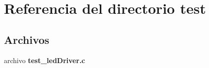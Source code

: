 \section{Referencia del directorio test}
\label{dir_13e138d54eb8818da29c3992edef070a}
\subsection*{Archivos}
\begin{DoxyCompactItemize}
\item 
archivo {\bf test\-\_\-led\-Driver.\-c}
\end{DoxyCompactItemize}
